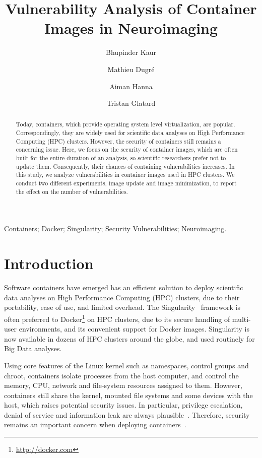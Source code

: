 \documentclass[a4paper,num-refs]{oup-contemporary}
\title{Vulnerability Analysis of Container Images in Neuroimaging}
\begin{document}
\author[1]{Bhupinder Kaur}
\author[1]{Mathieu Dugr\'e}
\author[1]{Aiman Hanna}
\author[1]{Tristan Glatard}


\maketitle

\begin{abstract}

Today, containers, which provide operating system level virtualization, are
popular. Correspondingly, they are widely used for scientific data analyses on 
High Performance Computing (HPC) clusters. However, the security of containers
still remains a concerning issue. Here, we focus on the security of container
images, which are often built for the entire
duration of an analysis, so scientific researchers prefer not to update
them. Consequently, their chances of containing vulnerabilities increases.  
In this study, we analyze vulnerabilities in container images used in 
HPC clusters.
We conduct two different
experiments, image update and image minimization, to report the effect 
on the number of vulnerabilities.

\end{abstract}

\begin{keywords}
Containers; Docker; Singularity; Security Vulnerabilities; Neuroimaging.
\end{keywords}


\section{Introduction}

Software containers have emerged has an efficient solution to deploy
scientific data analyses on High Performance Computing (HPC) clusters, due
to their portability, ease of use, and limited overhead. The
Singularity~\cite{kurtzer2017singularity} framework is often preferred to
Docker\footnote{\url{http://docker.com}} on HPC clusters, due to its
secure handling of multi-user environments, and its convenient support for
Docker images. Singularity is now available in dozens of HPC
clusters around the globe, and used routinely for Big Data analyses.

Using core features of the Linux kernel such as namespaces, control groups
and chroot, containers isolate processes from the
host computer,  
and control the memory, CPU, network and file-system resources assigned to
them. However, containers still share the kernel, mounted file systems and
some devices with the host, which raises potential security issues. In
particular, privilege escalation, denial of service and information leak
are always plausible~\cite{gantikow2016providing}. Therefore, security remains 
an important concern when deploying containers~\cite{bettini2015vulnerability}.
\end{document}
